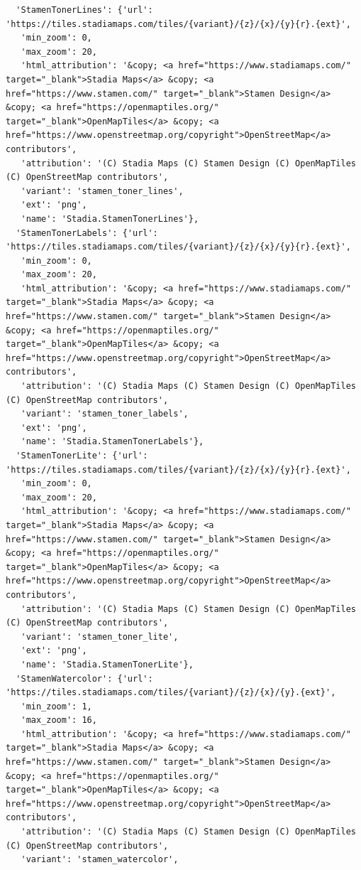 \documentclass[
  letterpaper,
  DIV=11,
  numbers=noendperiod]{scrreprt}
\begin{document}
\begin{verbatim}
  'StamenTonerLines': {'url': 'https://tiles.stadiamaps.com/tiles/{variant}/{z}/{x}/{y}{r}.{ext}',
   'min_zoom': 0,
   'max_zoom': 20,
   'html_attribution': '&copy; <a href="https://www.stadiamaps.com/" target="_blank">Stadia Maps</a> &copy; <a href="https://www.stamen.com/" target="_blank">Stamen Design</a> &copy; <a href="https://openmaptiles.org/" target="_blank">OpenMapTiles</a> &copy; <a href="https://www.openstreetmap.org/copyright">OpenStreetMap</a> contributors',
   'attribution': '(C) Stadia Maps (C) Stamen Design (C) OpenMapTiles (C) OpenStreetMap contributors',
   'variant': 'stamen_toner_lines',
   'ext': 'png',
   'name': 'Stadia.StamenTonerLines'},
  'StamenTonerLabels': {'url': 'https://tiles.stadiamaps.com/tiles/{variant}/{z}/{x}/{y}{r}.{ext}',
   'min_zoom': 0,
   'max_zoom': 20,
   'html_attribution': '&copy; <a href="https://www.stadiamaps.com/" target="_blank">Stadia Maps</a> &copy; <a href="https://www.stamen.com/" target="_blank">Stamen Design</a> &copy; <a href="https://openmaptiles.org/" target="_blank">OpenMapTiles</a> &copy; <a href="https://www.openstreetmap.org/copyright">OpenStreetMap</a> contributors',
   'attribution': '(C) Stadia Maps (C) Stamen Design (C) OpenMapTiles (C) OpenStreetMap contributors',
   'variant': 'stamen_toner_labels',
   'ext': 'png',
   'name': 'Stadia.StamenTonerLabels'},
  'StamenTonerLite': {'url': 'https://tiles.stadiamaps.com/tiles/{variant}/{z}/{x}/{y}{r}.{ext}',
   'min_zoom': 0,
   'max_zoom': 20,
   'html_attribution': '&copy; <a href="https://www.stadiamaps.com/" target="_blank">Stadia Maps</a> &copy; <a href="https://www.stamen.com/" target="_blank">Stamen Design</a> &copy; <a href="https://openmaptiles.org/" target="_blank">OpenMapTiles</a> &copy; <a href="https://www.openstreetmap.org/copyright">OpenStreetMap</a> contributors',
   'attribution': '(C) Stadia Maps (C) Stamen Design (C) OpenMapTiles (C) OpenStreetMap contributors',
   'variant': 'stamen_toner_lite',
   'ext': 'png',
   'name': 'Stadia.StamenTonerLite'},
  'StamenWatercolor': {'url': 'https://tiles.stadiamaps.com/tiles/{variant}/{z}/{x}/{y}.{ext}',
   'min_zoom': 1,
   'max_zoom': 16,
   'html_attribution': '&copy; <a href="https://www.stadiamaps.com/" target="_blank">Stadia Maps</a> &copy; <a href="https://www.stamen.com/" target="_blank">Stamen Design</a> &copy; <a href="https://openmaptiles.org/" target="_blank">OpenMapTiles</a> &copy; <a href="https://www.openstreetmap.org/copyright">OpenStreetMap</a> contributors',
   'attribution': '(C) Stadia Maps (C) Stamen Design (C) OpenMapTiles (C) OpenStreetMap contributors',
   'variant': 'stamen_watercolor',

\end{verbatim}
\end{document}
